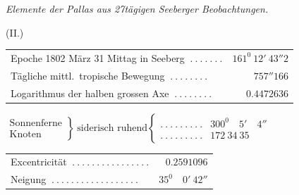 \begin{center}
\textit{Elemente der Pallas aus 27tägigen Seeberger Beobachtungen.}\par\medskip
(II.)\par\medskip
{\small\setlength{\tabcolsep}{2pt}
\begin{tabular}{l r}
Epoche 1802 März 31 Mittag in Seeberg $\ .\ .\ .\ .\ .\ .\ .$&$161^0\ 12'\ 43''2$\\
Tägliche mittl.\ tropische Bewegung $\ .\ .\ .\ .\ .\ .\ .\ .$&$757''166$\\
Logarithmus der halben grossen Axe $\ .\ .\ .\ .\ .\ .\ .\ .$&$0.4472636$
\end{tabular}
\par\smallskip
$\left.\begin{array}{l}\text{Sonnenferne}\\\text{Knoten}\end{array}\right\}\ \text{siderisch ruhend}\left\{\begin{array}{lr}
.\ .\ .\ .\ .\ .\ .\ .\ .&300^0\quad5'\quad4''\\
.\ .\ .\ .\ .\ .\ .\ .\ .&172\ 34\ 35
\end{array}\right.$
\par\smallskip
\begin{tabular}{l r}
Excentricität $\ .\ .\ .\ .\ .\ .\ .\ .\ .\ .\ .\ .\ .\ .\ .\ .$&$0.2591096$\\
Neigung $\ .\ .\ .\ .\ .\ .\ .\ .\ .\ .\ .\ .\ .\ .\ .\ .\ .\ .$&$35^0\quad0'\ 42''$
\end{tabular}}
\end{center}

